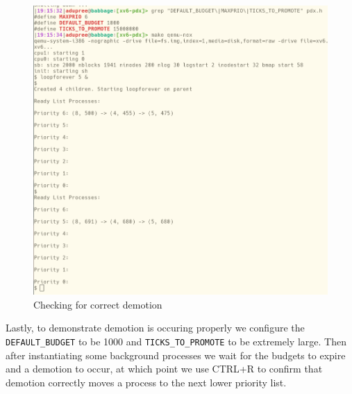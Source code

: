 \documentclass[11pt,letterpaper]{report}
\newcommand{\code}[1]{\colorbox{codegray}{\texttt{#1}}}
\begin{document}
{  \begin{figure}[h!]
	\centering
	\includegraphics[width=1\linewidth]{maxprio-6-lists3.png}
	\caption[img]{Checking for correct demotion}
	\label{fig:P1compileP0-1}
  \end{figure}

  Lastly, to demonstrate demotion is occuring properly we configure the \code{DEFAULT\_BUDGET}
  to be 1000 and \code{TICKS\_TO\_PROMOTE} to be extremely large. Then after instantiating some 
  background processes we wait for the budgets to expire and a demotion to occur, at which point 
  we use CTRL+R to confirm that demotion correctly moves a process to the next lower priority list.

\ifdefined \LF
} %
\fi
\end{document}

